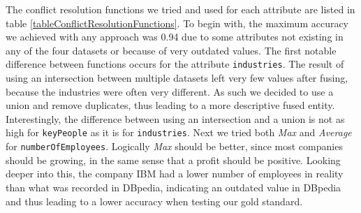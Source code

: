 The conflict resolution functions we tried and used for each attribute are listed in table \ref{tableConflictResolutionFunctions}. To begin with, the maximum accuracy we achieved with any approach was 0.94 due to some attributes not existing in any of the four datasets or because of very outdated values. The first notable difference between functions occurs for the attribute \texttt{industries}. The result of using an intersection between multiple datasets left very few values after fusing, because the industries were often very different. As such we decided to use a union and remove duplicates, thus leading to a more descriptive fused entity. Interestingly, the difference between using an intersection and a union is not as high for \texttt{keyPeople} as it is for \texttt{industries}. 
Next we tried both \textit{Max} and \textit{Average} for \texttt{numberOfEmployees}. Logically \textit{Max} should be better, since most companies should be growing, in the same sense that a profit should be positive. Looking deeper into this, the company IBM had a lower number of employees in reality than what was recorded in DBpedia, indicating an outdated value in DBpedia and thus leading to a lower accuracy when testing our gold standard. 



